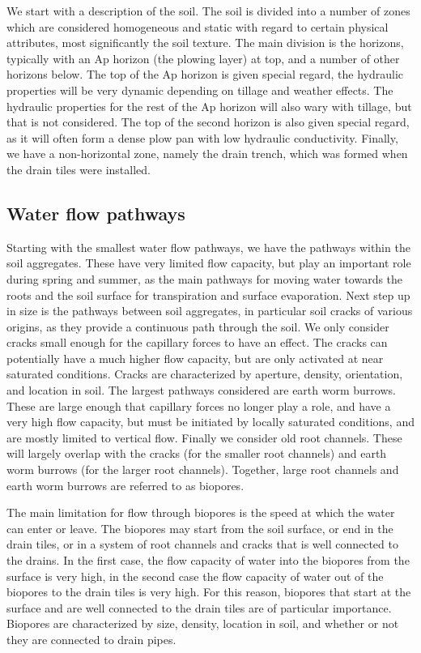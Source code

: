 \documentclass[a4paper]{article}
\begin{document}
We start with a description of the soil.  The soil is divided into a
number of zones which are considered homogeneous and static with
regard to certain physical attributes, most significantly the soil
texture.  The main division is the horizons, typically with an Ap
horizon (the plowing layer) at top, and a number of other horizons
below.  The top of the Ap horizon is given special regard, the
hydraulic properties will be very dynamic depending on tillage and
weather effects.  The hydraulic properties for the rest of the Ap
horizon will also wary with tillage, but that is not considered.  The
top of the second horizon is also given special regard, as it will
often form a dense plow pan with low hydraulic conductivity.  Finally,
we have a non-horizontal zone, namely the drain trench, which was
formed when the drain tiles were installed.

\subsection{Water flow pathways}

Starting with the smallest water flow pathways, we have the pathways
within the soil aggregates.  These have very limited flow capacity,
but play an important role during spring and summer, as the main
pathways for moving water towards the roots and the soil surface for
transpiration and surface evaporation.  Next step up in size is the
pathways between soil aggregates, in particular soil cracks of various
origins, as they provide a continuous path through the soil.  We only
consider cracks small enough for the capillary forces to have an
effect.  The cracks can potentially have a much higher flow capacity,
but are only activated at near saturated conditions.  Cracks are
characterized by aperture, density, orientation, and location in soil.
The largest pathways considered are earth worm burrows.  These are
large enough that capillary forces no longer play a role, and have a
very high flow capacity, but must be initiated by locally saturated
conditions, and are mostly limited to vertical flow.  Finally we
consider old root channels.  These will largely overlap with the
cracks (for the smaller root channels) and earth worm burrows (for the
larger root channels).  Together, large root channels and earth worm
burrows are referred to as biopores.

The main limitation for flow through biopores is the speed at which
the water can enter or leave.  The biopores may start from the soil
surface, or end in the drain tiles, or in a system of root channels
and cracks that is well connected to the drains.  In the first case,
the flow capacity of water into the biopores from the surface is very
high, in the second case the flow capacity of water out of the
biopores to the drain tiles is very high.  For this reason, biopores
that start at the surface and are well connected to the drain tiles
are of particular importance.  Biopores are characterized by size,
density, location in soil, and whether or not they are connected to
drain pipes.
\end{document}
